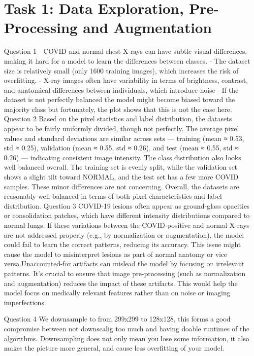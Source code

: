 \documentclass[conference]{IEEEtran}
\begin{document}
\section{Task 1: Data Exploration, Pre-Processing and Augmentation}\label{sec:task_1}
Question 1
-	COVID and normal chest X-rays can have subtle visual differences, making it hard for a model to learn the differences between classes.
-	The dataset size is relatively small (only 1600 training images), which increases the risk of overfitting.
-	X-ray images often have variability in terms of brightness, contrast, and anatomical differences between individuals, which introduce noise
-	If the dataset is not perfectly balanced the model might become biased toward the majority class but fortunately, the plot shows that this is not the case here.
Question 2
Based on the pixel statistics and label distribution, the datasets appear to be fairly uniformly divided, though not perfectly. The average pixel values and standard deviations are similar across sets — training (mean ≈ 0.53, std ≈ 0.25), validation (mean ≈ 0.55, std ≈ 0.26), and test (mean ≈ 0.55, std ≈ 0.26) — indicating consistent image intensity. The class distribution also looks well balanced overall. The training set is evenly split, while the validation set shows a slight tilt toward NORMAL, and the test set has a few more COVID samples. These minor differences are not concerning. Overall, the datasets are reasonably well-balanced in terms of both pixel characteristics and label distribution.
Question 3
COVID-19 lesions often appear as ground-glass opacities or consolidation patches, which have different intensity distributions compared to normal lungs.
If these variations between the COVID-positive and normal X-rays are not addressed properly (e.g., by normalization or augmentation), the model could fail to learn the correct patterns, reducing its accuracy. This issue might cause the model to misinterpret lesions as part of normal anatomy or vice versa.Unaccounted-for artifacts can mislead the model by focusing on irrelevant patterns. It’s crucial to ensure that image pre-processing (such as normalization and augmentation) reduces the impact of these artifacts. This would help the model focus on medically relevant features rather than on noise or imaging imperfections.

Question 4
We downsample to from 299x299 to 128x128, this forms a good compromise between not downscalig too much and having doable runtimes of the algorithms.
Downsampling does not only mean you lose some information, it also makes the picture more general, and cause less overfitting of your model.
\end{document}
